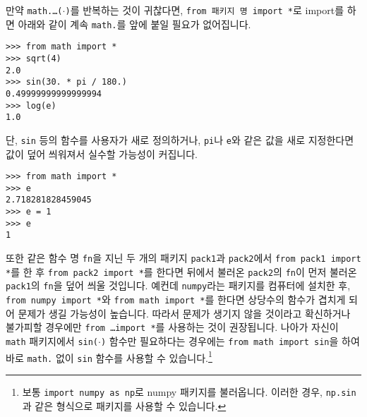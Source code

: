 \documentclass[../main.tex]{subfiles}
\begin{document}
만약 \texttt{math.\dots($\cdot$)}를 반복하는 것이 귀찮다면, \texttt{from 패키지 명 import *}로 import를 하면 아래와 같이 계속 \texttt{math.}를 앞에 붙일 필요가 없어집니다.
\begin{verbatim}
>>> from math import *
>>> sqrt(4)
2.0
>>> sin(30. * pi / 180.)
0.49999999999999994
>>> log(e)
1.0
\end{verbatim}
단, \texttt{sin} 등의 함수를 사용자가 새로 정의하거나, \texttt{pi}나 \texttt{e}와 같은 값을 새로 지정한다면 값이 덮어 씌워져서 실수할 가능성이 커집니다.
\begin{verbatim}
>>> from math import *
>>> e
2.718281828459045
>>> e = 1
>>> e
1
\end{verbatim}
또한 같은 함수 명 \texttt{fn}을 지닌 두 개의 패키지 \texttt{pack1}과 \texttt{pack2}에서 \texttt{from pack1 import *}를 한 후 \texttt{from pack2 import *}를 한다면 뒤에서 불러온 \texttt{pack2}의 \texttt{fn}이 먼저 불러온 \texttt{pack1}의 \texttt{fn}을 덮어 씌울 것입니다.
예컨데 \texttt{numpy}라는 패키지를 컴퓨터에 설치한 후, \texttt{from numpy import *}와 \texttt{from math import *}를 한다면 상당수의 함수가 겹치게 되어 문제가 생길 가능성이 높습니다.
따라서 문제가 생기지 않을 것이라고 확신하거나 불가피할 경우에만 \texttt{from \dots import *}를 사용하는 것이 권장됩니다.
나아가 자신이 \texttt{math} 패키지에서 \texttt{sin($\cdot$)} 함수만 필요하다는 경우에는 \texttt{from math import sin}을 하여 바로 \texttt{math.} 없이 \texttt{sin} 함수를 사용할 수 있습니다.\footnote{보통 \texttt{import numpy as np}로 numpy 패키지를 불러옵니다. 이러한 경우, \texttt{np.sin}과 같은 형식으로 패키지를 사용할 수 있습니다.}
\end{document}
